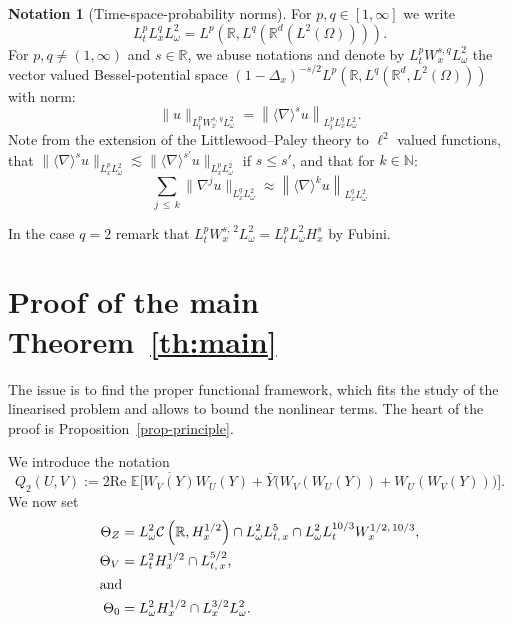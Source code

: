 \documentclass[10pt]{amsart}
\theoremstyle{definition}\newtheorem{defi}[theo]{Definition}\newtheorem{rema}[theo]{Remark}\newtheorem{exam}[theo]{Example}\newtheorem{exem}[theo]{Example}\newtheorem{nota}[theo]{Notation}
\newcommand{\R}{\mathbb{R}}
\newcommand{\N}{\mathbb{N}}
\newcommand{\E}{\mathbb{E}}
\newcommand{\mclC}{\mathcal{C}}
\begin{document}
\begin{nota}[Time-space-probability norms]
For $p,q\in [1,\infty]$ we write
\[
L^p_tL^q_x L^2_\omega= L^p\left(\R,L^q\left(\R^d\left(L^2(\Omega)\right)\right)\right).
\]
For $p,q\neq (1,\infty)$ and $s\in \R$, we abuse notations and denote by $L^p_t W^{s,q}_x L^2_\omega $ the vector valued Bessel-potential space $(1-\Delta_x)^{-s/2}L^p(\R,L^{q}(\R^d,L^2(\Omega)))$ with norm:
\[
\| u \|_{L^p_t W^{s,\,q}_x L^2_\omega}= \left\| \langle \nabla \rangle^{s} u \right\|_{L^p_tL^q_xL^2_\omega}.
\]
Note from the extension of the Littlewood--Paley theory to $\ell^2$ valued functions, that $\| \langle \nabla \rangle^s u \|_{L^p_xL^2_\omega}\lesssim \| \langle \nabla \rangle^{s'} u \|_{L^p_xL^2_\omega}$ if $s\leq s'$, and that for $k\in \N$:
\begin{equation}\label{id:vectorvaluedbesselpotential}
\sum_{j\,\leq\,k} \| \nabla^j u \|_{L^q_x L^2_\omega}\approx \left\| \langle \nabla \rangle^k u \right\|_{L^q_xL^2_\omega}
\end{equation}

In the case $q=2$ remark that $L^p_tW^{s,\,2}_xL^2_\omega =L^p_t L^2_\omega H^{s}_x$ by Fubini.
\end{nota}



\section{Proof of the main Theorem~\ref{th:main}}\label{sec:proof}


The issue is to find the proper functional framework, which fits the study of the linearised problem and allows to bound the nonlinear terms. The heart of the proof is Proposition~\ref{prop-principle}.

We introduce the notation
\begin{equation} \label{id:defQ2}
Q_2(U,V) := 2\textrm{Re }\E\Big[\overline{W_V(Y)} W_U(Y) + \bar Y \Big(W_V(W_U(Y)) + W_U(W_V(Y))\Big) \Big].
\end{equation}
We now set
\begin{align} 
\Theta_Z &= L^2_\omega\mclC\left(\R, H^{1/2}_x\right) \cap L^2_\omega L^5_{t,\,x} \cap L^2_\omega L^{10/3}_t W^{1/2,\,10/3}_x,\label{id:ThetaZ}
\\
\Theta_V &= L^2_{t}H^{1/2}_x \cap L^{5/2}_{t,\,x},\label{id:ThetaV}
\\
\intertext{and}
\Theta_0 &= L^2_\omega H^{1/2}_x \cap L^{3/2}_x L^2_\omega.
\label{id:Theta0}
\end{align}
\end{document}

